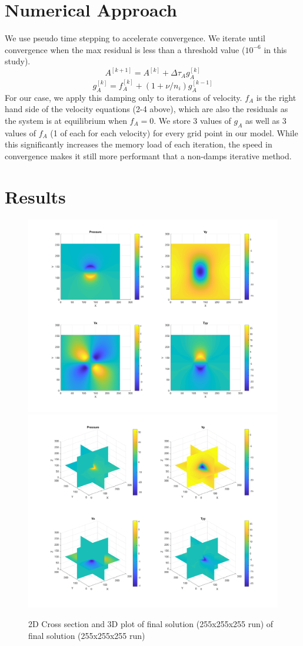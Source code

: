 \section*{\myfont Numerical Approach} %
We use pseudo time stepping to accelerate convergence. We iterate until convergence when the max residual is less than a threshold value ($10^{-6}$ in this study). 
$$A^{[k+1]} = A^{[k]} + \Delta \tau_A g_A^{[k]}$$
$$g_A^{[k]} = f_A^{[k]} + (1+\nu/n_i)g_A^{[k-1]}$$
For our case, we apply this damping only to iterations of velocity. $f_A$ is the right hand side of the velocity equations (2-4 above), which are also the residuals as the system is at equilibrium when $f_A=0$. We store 3 values of $g_A$ as well as 3 values of $f_A$ (1 of each for each velocity) for every grid point in our model. While this significantly increases the memory load of each iteration, the speed in convergence makes it still more performant that a non-damps iterative method. 

\section*{\myfont Results} %
\begin{figure}[h!]
\begin{center}
	\includegraphics[width = .48\textwidth]{../3dvis/plots2d.png}
	\includegraphics[width = .48\textwidth]{../3dvis/plots.png}
	\caption{\myfont 2D Cross section and 3D plot of final solution (255x255x255 run) of final solution (255x255x255 run)
}
\end{center}
\end{figure}


